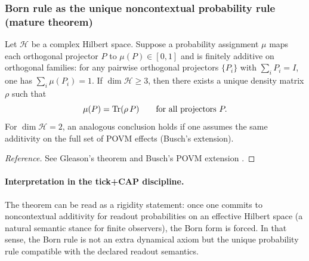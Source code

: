 \subsubsection{Born rule as the unique noncontextual probability rule (mature theorem)}
\label{subsec:z128_gleason_busch}

\begin{theorem}
\label{thm:z128_gleason_busch}
Let $\mathcal{H}$ be a complex Hilbert space.
Suppose a probability assignment $\mu$ maps each orthogonal projector $P$ to $\mu(P)\in[0,1]$ and is finitely additive on orthogonal families: for any pairwise orthogonal projectors $\{P_i\}$ with $\sum_i P_i = I$, one has $\sum_i \mu(P_i)=1$.
If $\dim\mathcal{H}\ge 3$, then there exists a unique density matrix $\rho$ such that
\[
\mu(P)=\mathrm{Tr}(\rho\,P)\qquad\text{for all projectors }P.
\]
For $\dim\mathcal{H}=2$, an analogous conclusion holds if one assumes the same additivity on the full set of POVM effects (Busch's extension).
\end{theorem}
\begin{proof}[Reference]
See Gleason's theorem \cite{Gleason1957} and Busch's POVM extension \cite{Busch2003}.
\end{proof}

\paragraph{Interpretation in the tick+CAP discipline.}
\InterfaceTag The theorem can be read as a rigidity statement: once one commits to noncontextual additivity for readout probabilities on an effective Hilbert space (a natural semantic stance for finite observers), the Born form is forced.
In that sense, the Born rule is not an extra dynamical axiom but the unique probability rule compatible with the declared readout semantics.

